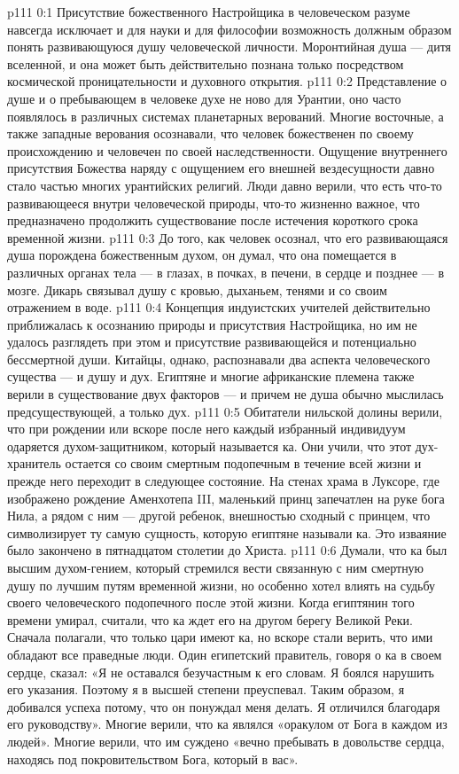 \author{Одиночный Вестник}
\vs p111 0:1 Присутствие божественного Настройщика в человеческом разуме навсегда исключает и для науки и для философии возможность должным образом понять развивающуюся душу человеческой личности. Моронтийная душа --- дитя вселенной, и она может быть действительно познана только посредством космической проницательности и духовного открытия.
\vs p111 0:2 \pc Представление о душе и о пребывающем в человеке духе не ново для Урантии, оно часто появлялось в различных системах планетарных верований. Многие восточные, а также западные верования осознавали, что человек божественен по своему происхождению и человечен по своей наследственности. Ощущение внутреннего присутствия Божества наряду с ощущением его внешней вездесущности давно стало частью многих урантийских религий. Люди давно верили, что есть что\hyp{}то развивающееся внутри человеческой природы, что\hyp{}то жизненно важное, что предназначено продолжить существование после истечения короткого срока временной жизни.
\vs p111 0:3 До того, как человек осознал, что его развивающаяся душа порождена божественным духом, он думал, что она помещается в различных органах тела --- в глазах, в почках, в печени, в сердце и позднее --- в мозге. Дикарь связывал душу с кровью, дыханьем, тенями и со своим отражением в воде.
\vs p111 0:4 Концепция  индуистских учителей действительно приближалась к осознанию природы и присутствия Настройщика, но им не удалось разглядеть при этом и присутствие развивающейся и потенциально бессмертной души. Китайцы, однако, распознавали два аспекта человеческого существа ---  и  душу и дух. Египтяне и многие африканские племена также верили в существование двух факторов ---  и  причем не душа обычно мыслилась предсуществующей, а только дух.
\vs p111 0:5 Обитатели нильской долины верили, что при рождении или вскоре после него каждый избранный индивидуум одаряется духом\hyp{}защитником, который называется ка. Они учили, что этот дух\hyp{}хранитель остается со своим смертным подопечным в течение всей жизни и прежде него переходит в следующее состояние. На стенах храма в Луксоре, где изображено рождение Аменхотепа III, маленький принц запечатлен на руке бога Нила, а рядом с ним --- другой ребенок, внешностью сходный с принцем, что символизирует ту самую сущность, которую египтяне называли ка. Это изваяние было закончено в пятнадцатом столетии до Христа.
\vs p111 0:6 Думали, что ка был высшим духом\hyp{}гением, который стремился вести связанную с ним смертную душу по лучшим путям временной жизни, но особенно хотел влиять на судьбу своего человеческого подопечного после этой жизни. Когда египтянин того времени умирал, считали, что ка ждет его на другом берегу Великой Реки. Сначала полагали, что только цари имеют ка, но вскоре стали верить, что ими обладают все праведные люди. Один египетский правитель, говоря о ка в своем сердце, сказал: «Я не оставался безучастным к его словам. Я боялся нарушить его указания. Поэтому я в высшей степени преуспевал. Таким образом, я добивался успеха потому, что он понуждал меня делать. Я отличился благодаря его руководству». Многие верили, что ка являлся «оракулом от Бога в каждом из людей». Многие верили, что им суждено «вечно пребывать в довольстве сердца, находясь под покровительством Бога, который в вас».
